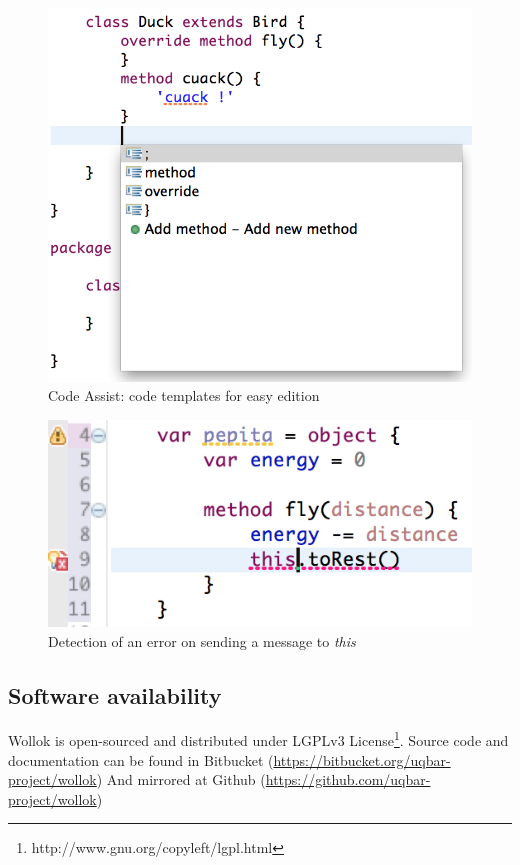 \begin{figure}[ht]
    \centering
	\includegraphics[scale=0.5]{images/wollok-paper-codetemplates.png}
    \caption{Code Assist: code templates for easy edition}
    \label{fig:codetemplates.png}
\end{figure}

\begin{figure}[ht]
    \centering
	\includegraphics[scale=0.5]{images/wollok-paper-check-noMethodOnThis.png}
    \caption{Detection of an error on sending a message to \emph{this}}
    \label{fig:check-noMethodOnThis.png}
\end{figure}

\subsection{Software availability}

Wollok is open-sourced and distributed under LGPLv3 License\footnote{http://www.gnu.org/copyleft/lgpl.html}.
Source code and documentation can be found in Bitbucket (\url{https://bitbucket.org/uqbar-project/wollok}) 
And mirrored at Github (\url{https://github.com/uqbar-project/wollok})